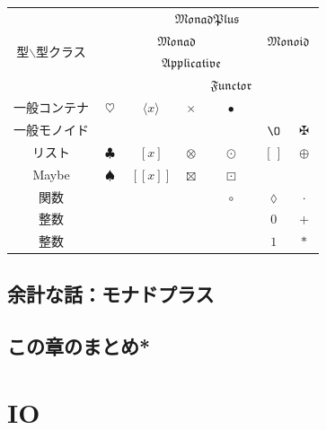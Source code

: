 \documentclass[a4paper]{jsbook}
\def\[{\left[\!\left[}
\def\]{\right]\!\right]}
\newcommand{\mZero}{\O}
\newcommand{\mListWith}[1]{\left[#1\right]}
\newcommand{\mMaybeWith}[1]{\[#1\]}
\newcommand{\mPureWith}[1]{\langle#1\rangle}
\newcommand{\mSpecialTypeClass}[1]{\mathfrak{#1}} %
\newcommand{\mMonoidTypeClass}{\mSpecialTypeClass{Monoid}}
\newcommand{\mFunctorTypeClass}{\mSpecialTypeClass{Functor}}
\newcommand{\mApplicativeTypeClass}{\mSpecialTypeClass{Applicative}}
\newcommand{\mMonadTypeClass}{\mSpecialTypeClass{Monad}}
\newcommand{\mMonadPlusTypeClass}{\mSpecialTypeClass{MonadPlus}}
\newcommand{\mEmptyList}{{[\,]}}
\newcommand{\mAnonParameter}{\lozenge}
\DeclareMathOperator{\mPlus}{\maltese}
\DeclareMathOperator{\mComp}{\cdot}
\DeclareMathOperator{\mAppend}{\oplus}
\DeclareMathOperator{\mMap}{\bullet}
\DeclareMathOperator{\mMapList}{\odot}
\DeclareMathOperator{\mMapMaybe}{\boxdot}
\DeclareMathOperator{\mMapFunc}{\circ}
\DeclareMathOperator{\mAppMap}{\times}
\DeclareMathOperator{\mAppMapList}{\otimes}
\DeclareMathOperator{\mAppMapMaybe}{\boxtimes}
\DeclareMathOperator{\mBindList}{\clubsuit}%
\DeclareMathOperator{\mBindMaybe}{\spadesuit}%
\DeclareMathOperator{\mBind}{\heartsuit}%
\begin{document}



\begin{table}
\begin{center}
\begin{tabular}{||c||c|c|c|c|c|c||}
\hline
\multirow{4}{*}{型$\backslash$型クラス}
  &\multicolumn{6}{|c||}{$\mMonadPlusTypeClass$}\\
\cline{2-7}
\multirow{3}{*}{}
  &\multicolumn{4}{|c|}{$\mMonadTypeClass$}
  &\multicolumn{2}{|c||}{$\mMonoidTypeClass$}\\
\cline{3-5}
\multirow{2}{*}{}
  &
  &\multicolumn{3}{|c|}{$\mApplicativeTypeClass$}
  &\multicolumn{2}{|c||}{}\\
\cline{5-5}
\multirow{1}{*}{}
  &
  &\multicolumn{2}{|c|}{}
  &$\mFunctorTypeClass$
  &\multicolumn{2}{|c||}{}\\
\hline\hline
一般コンテナ
  &$\mBind$
  &$\mPureWith{x}$
  &$\mAppMap$
  &$\mMap$
  &
  &\\
\hline
一般モノイド
  &
  &
  &
  &
  &$\mZero$
  &$\mPlus$\\
\hline
リスト
  &$\mBindList$
  &$\mListWith{x}$
  &$\mAppMapList$
  &$\mMapList$
  &$\mEmptyList$
  &$\mAppend$\\
\hline
Maybe
  &$\mBindMaybe$
  &$\mMaybeWith{x}$
  &$\mAppMapMaybe$
  &$\mMapMaybe$
  &
  &\\
\hline
関数
  & %
  & %
  & %
  &$\mMapFunc$
  &$\mAnonParameter$
  &$\mComp$\\
\hline
整数
  &
  &
  &
  &
  &$0$
  &$+$\\
\hline  
整数
  &
  &
  &
  &
  &$1$
  &$*$\\
\hline  
\end{tabular}
\end{center}
\end{table}

\section{余計な話：モナドプラス}
\section*{この章のまとめ*}

\chapter{IO}
\end{document}
